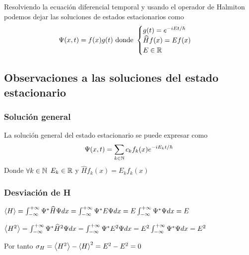 Resolviendo la ecuación diferencial temporal y usando el operador de Halmiton podemos dejar las soluciones de estados estacionarios como
\begin{equation}
    \label{solucion_estado_estacionario}
    \Psi(x,t)=f(x)g(t)\text{ donde }
    \begin{cases}
        g(t)=e^{-iEt/\hbar}\\
        \widehat{H}f(x)=Ef(x)\\
        E\in\mathbb{R}
    \end{cases}
\end{equation}

\subsection{Observaciones a las soluciones del estado estacionario}

\subsubsection{Solución general}
La solución general del estado estacionario se puede expresar como
\begin{equation}
    \label{solucion_general_estado_estacionario}
    \Psi(x,t)=\sum_{k\in\mathbb{N}}c_k f_k(x)e^{-iE_k t/\hbar}
\end{equation}
Donde $\forall k\in\mathbb{N}$ $E_k\in\mathbb{R}$ y $\widehat{H}f_k(x)=E_k f_k(x)$

\subsubsection{Desviación de H}
$\left\langle H\right\rangle = \int_{-\infty}^{+\infty}\Psi^* \widehat{H}\Psi dx = \int_{-\infty}^{+\infty}\Psi^* E\Psi dx=E\int_{-\infty}^{+\infty}\Psi^* \Psi dx = E$

$\left\langle H^2\right\rangle = \int_{-\infty}^{+\infty}\Psi^* \widehat{H}^2\Psi dx = \int_{-\infty}^{+\infty}\Psi^* E^2\Psi dx=E^2\int_{-\infty}^{+\infty}\Psi^* \Psi dx = E^2$

Por tanto $\sigma_H=\left\langle H^2\right\rangle-\left\langle H\right\rangle^2=E^2-E^2=0$
